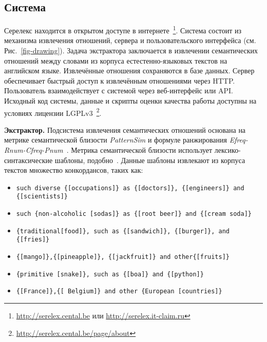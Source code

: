 \documentclass[a4paper,10pt,twoside]{article}
\begin{document}
\subsection{Система}

Серелекс находится в открытом доступе в интернете~\footnote{\url{http://serelex.cental.be} или \url{http://serelex.it-claim.ru} }.
Система состоит из механизма извлечения отношений, сервера и пользовательского интерфейса (см. Рис.~\ref{fig-drawing}). Задача экстрактора заключается в извлечении семантических отношений между словами из корпуса естестенно-языковых текстов на английском языке. Извлечённые отношения сохраняются в базе данных. Сервер обеспечивает быстрый доступ к извлечённым отношениями через HTTP. Пользователь взаимодействует с системой через веб-интерфейс или API. Исходный код системы, данные и скрипты оценки качества работы доступны на условиях лицензии LGPLv3~\footnote{ \url{http://serelex.cental.be/page/about} }.


\textbf{Экстрактор.} Подсистема извлечения семантических отношений основана на метрике семантической близости \textit{PatternSim} и формуле ранжирования \textit{Efreq-Rnum-Cfreq-Pnum}~\cite{panchenko2012konvens}. Метрика семантической близости использует лексико-синтаксические шаблоны, подобно~\cite{hearst1992}. Данные шаблоны извлекают из корпуса текстов множество конкордансов, таких как: 

\begin{itemize}
\footnotesize
\item \texttt{such diverse \{[occupations]\} as \{[doctors]\}, \{[engineers]\} and \{[scientists]\}}

\item \texttt{such \{non-alcoholic [sodas]\} as \{[root beer]\} and \{[cream 
 soda]\}}
 
\item \texttt{\{traditional[food]\}, such as \{[sandwich]\}, \{[burger]\}, and \{[fries]\}}

\item \texttt{\{[mango]\},\{[pineapple]\}, \{[jackfruit]\} and other\{[fruits]\}}

\item \texttt{\{primitive [snake]\}, such as \{[boa]\} and \{[python]\}}
\item \texttt{\{[France]\},\{[ Belgium]\} and other \{European [countries]\}}
\end{itemize}
\end{document}
